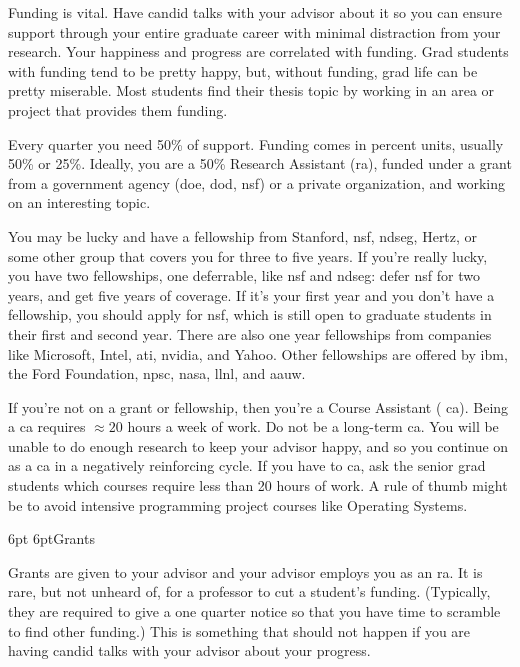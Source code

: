 \documentclass[10pt]{book}
\makeatletter
\renewcommand{\subsection}{\@startsection{subsection}{2}{0mm}%
   {6pt}%
   {6pt}{\normalfont\normalsize\itshape}}
\makeatother
\begin{document}
Funding is vital. Have candid talks with your advisor about it
so you can ensure support through your entire graduate career with minimal
distraction from your research. Your happiness and progress are correlated with
funding. Grad students with funding tend to be pretty
happy, but, without funding, grad life can be pretty miserable. Most students 
find their thesis topic by working in an area or project that provides
them funding.

Every quarter you need 50\% of support. Funding comes in percent units,
usually 50\% or 25\%. Ideally, you are a 50\% Research Assistant ({\sc ra}),
funded under a grant from a government agency ({\sc doe}, {\sc dod}, {\sc nsf})
or a private organization, and working on an interesting topic.

You may be lucky and have a fellowship from Stanford, {\sc nsf}, {\sc ndseg},
Hertz, or some other group that covers you for three to five years. If you're
really lucky, you have two fellowships, one deferrable, like {\sc nsf} and {\sc
ndseg}: defer {\sc nsf} for two years, and get five years of coverage. If it's your
first year and you don't have a fellowship, you should apply for {\sc nsf},
which is still open to graduate students in their first and second year. There are
also one year fellowships from companies like Microsoft, Intel, {\sc ati},
{\sc nvidia}, and Yahoo.  Other fellowships are offered by {\sc ibm}, the Ford
Foundation, {\sc npsc}, {\sc nasa}, {\sc llnl}, and {\sc aauw}.

If you're not on a grant or fellowship, then you're a Course Assistant ({\sc
ca}). Being a {\sc ca} requires $\approx 20$
hours a week of work. Do not be a long-term {\sc ca}. You will be unable to do enough research 
to keep your advisor happy, and so you continue on as a {\sc ca}
in a negatively reinforcing cycle.  If you have to {\sc ca}, ask the senior
grad students which courses require less than 20 hours
of work. A rule of thumb might be to avoid intensive programming project
courses like Operating Systems.

\subsection{Grants}

Grants are given to your advisor and your advisor employs you as an {\sc ra}. It is
rare, but not unheard of, for a professor to cut a student's funding.
(Typically, they are required to give a one quarter notice so that you
have time to scramble to find other funding.) This is something that should not
happen if you are having candid talks with your advisor about your
progress.
\end{document}
